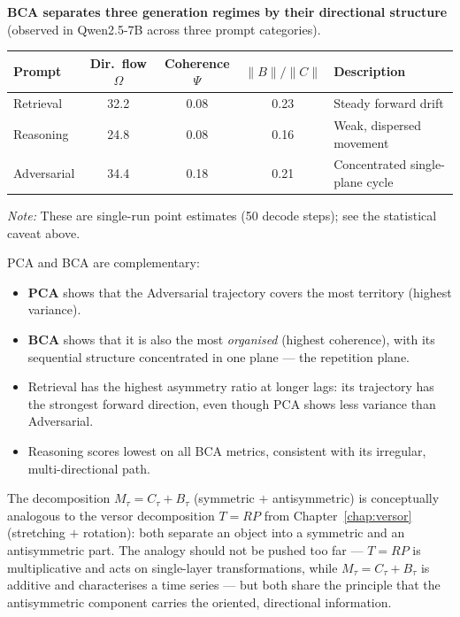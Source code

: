 \documentclass[11pt, twoside, openright]{memoir}
\numberwithin{equation}{chapter}
\begin{document}
\begin{finding}
\textbf{BCA separates three generation regimes by their directional
structure}
(observed in Qwen2.5-7B across three prompt categories).

\medskip
\begin{center}
\renewcommand{\arraystretch}{1.3}\small
\begin{tabular}{@{} l c c c l @{}}
\toprule
\textbf{Prompt} & \textbf{Dir.\ flow} $\Omega$
  & \textbf{Coherence} $\Psi$ & $\|B\|/\|C\|$
  & \textbf{Description} \\
\midrule
Retrieval   & 32.2 & 0.08 & 0.23 & Steady forward drift \\
Reasoning   & 24.8 & 0.08 & 0.16 & Weak, dispersed movement \\
Adversarial & 34.4 & 0.18 & 0.21 & Concentrated single-plane cycle \\
\bottomrule
\end{tabular}
\end{center}

\smallskip
\noindent\emph{Note:} These are single-run point estimates (50 decode
steps); see the statistical caveat above.

\medskip
PCA and BCA are complementary:
\begin{itemize}[nosep]
\item \textbf{PCA} shows that the Adversarial trajectory covers the
  most territory (highest variance).
\item \textbf{BCA} shows that it is also the most \emph{organised}
  (highest coherence), with its sequential structure concentrated
  in one plane --- the repetition plane.
\item Retrieval has the highest asymmetry ratio at longer lags:
  its trajectory has the strongest forward direction, even
  though PCA shows less variance than Adversarial.
\item Reasoning scores lowest on all BCA metrics, consistent with
  its irregular, multi-directional path.
\end{itemize}

The decomposition $M_\tau = C_\tau + B_\tau$ (symmetric $+$
antisymmetric) is conceptually analogous to the versor decomposition
$T = RP$ from Chapter~\ref{chap:versor} (stretching $+$ rotation):
both separate an object into a symmetric and an antisymmetric part.
The analogy should not be pushed too far --- $T = RP$ is
multiplicative and acts on single-layer transformations, while
$M_\tau = C_\tau + B_\tau$ is additive and characterises a time
series --- but both share the principle that the antisymmetric
component carries the oriented, directional information.
\end{finding}
\end{document}
